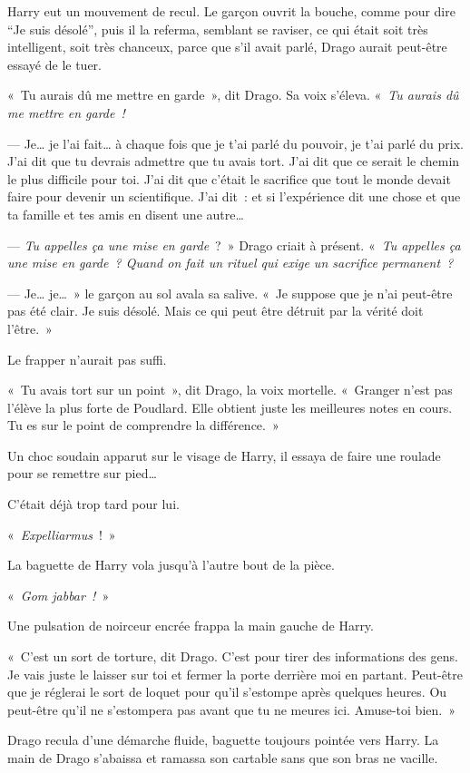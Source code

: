 Harry eut un mouvement de recul. Le garçon ouvrit la bouche, comme pour dire “Je suis désolé”, puis il la referma, semblant se raviser, ce qui était soit très intelligent, soit très chanceux, parce que s'il avait parlé, Drago aurait peut-être essayé de le tuer.

«~Tu aurais dû me mettre en garde~», dit Drago. Sa voix s'éleva. «~\emph{Tu aurais dû me mettre en garde~!}

--- Je… je l'ai fait… à chaque fois que je t'ai parlé du pouvoir, je t'ai parlé du prix. J'ai dit que tu devrais admettre que tu avais tort. J'ai dit que ce serait le chemin le plus difficile pour toi. J'ai dit que c'était le sacrifice que tout le monde devait faire pour devenir un scientifique. J'ai dit~: et si l'expérience dit une chose et que ta famille et tes amis en disent une autre…

--- \emph{Tu appelles ça une mise en garde}~?~» Drago criait à présent. «~\emph{Tu appelles ça une mise en garde~? Quand on fait un rituel qui exige un sacrifice permanent~?}

--- Je… je…~» le garçon au sol avala sa salive. «~Je suppose que je n'ai peut-être pas été clair. Je suis désolé. Mais ce qui peut être détruit par la vérité doit l'être.~»

Le frapper n'aurait pas suffi.

«~Tu avais tort sur un point~», dit Drago, la voix mortelle. «~Granger n'est pas l'élève la plus forte de Poudlard. Elle obtient juste les meilleures notes en cours. Tu es sur le point de comprendre la différence.~»

Un choc soudain apparut sur le visage de Harry, il essaya de faire une roulade pour se remettre sur pied…

C'était déjà trop tard pour lui.

«~\emph{Expelliarmus}~!~»

La baguette de Harry vola jusqu'à l'autre bout de la pièce.

«~\emph{Gom jabbar~!}~»

Une pulsation de noirceur encrée frappa la main gauche de Harry.

«~C'est un sort de torture, dit Drago. C'est pour tirer des informations des gens. Je vais juste le laisser sur toi et fermer la porte derrière moi en partant. Peut-être que je réglerai le sort de loquet pour qu'il s'estompe après quelques heures. Ou peut-être qu'il ne s'estompera pas avant que tu ne meures ici. Amuse-toi bien.~»

Drago recula d'une démarche fluide, baguette toujours pointée vers Harry. La main de Drago s'abaissa et ramassa son cartable sans que son bras ne vacille.

